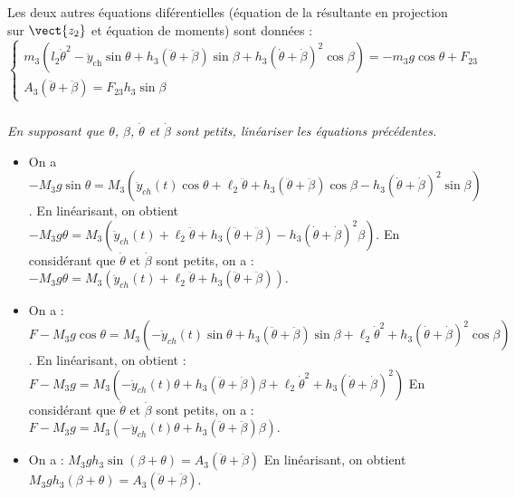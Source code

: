 \documentclass[10pt,fleqn]{article} %
\begin{document}
Les deux autres équations diférentielles (équation de la résultante en projection sur $\vect{z_2}$ et équation de moments) sont données :
$$
\left\{
\begin{array}{l}
m_3\left(
l_2\dot{\theta}^2 - \ddot{y}_{\text{ch}} \sin \theta  
+ h_3\left(\ddot{\theta}+\ddot{\beta}\right)\sin \beta
+ h_3\left(\dot{\theta}+\dot{\beta}\right)^2\cos \beta
\right)=-m_3 g \cos \theta + F_{23} \\
A_3\left(\ddot{\theta}+\ddot{\beta}\right)=F_{23}h_3\sin\beta
\end{array}
\right.
$$
\subparagraph{\label{q16}}
\textit{En supposant que $\theta$, $\beta$, $\dot{\theta}$ et $\dot{\beta}$ sont petits, linéariser les équations précédentes.  }
\ifprof
\begin{corrige}
\begin{itemize}
\item On a 
$ -M_3 g \sin \theta  = 
 M_3\left(\ddot{y}_{ch}(t) \cos \theta +\ell_2\ddot{\theta} +h_3\left(\ddot{\theta}+\ddot{\beta}\right)\cos \beta 
-h_3\left(\dot{\theta}+\dot{\beta}\right)^2\sin\beta \right)$. En linéarisant, on obtient 
$ -M_3 g \theta  = 
 M_3\left(\ddot{y}_{ch}(t) +\ell_2\ddot{\theta} +h_3\left(\ddot{\theta}+\ddot{\beta}\right) 
-h_3\left(\dot{\theta}+\dot{\beta}\right)^2\beta \right)$. En considérant que $\dot{\theta}$ et $\dot{\beta}$ sont petits, on a : 
$ -M_3 g \theta  = 
 M_3\left(\ddot{y}_{ch}(t) +\ell_2\ddot{\theta} +h_3\left(\ddot{\theta}+\ddot{\beta}\right)  \right)$.
\item  On a : $F-M_3 g \cos \theta  = 
 M_3\left(- \ddot{y}_{ch}(t) \sin \theta +h_3\left(\ddot{\theta}+\ddot{\beta}\right) \sin\beta
+   
\ell_2\dot{\theta}^2   +h_3\left(\dot{\theta}+\dot{\beta}\right)^2\cos \beta \right) $. En linéarisant, on obtient :
$F-M_3 g  = 
 M_3\left(- \ddot{y}_{ch}(t) \theta +h_3\left(\ddot{\theta}+\ddot{\beta}\right) \beta
+   
\ell_2\dot{\theta}^2   +h_3\left(\dot{\theta}+\dot{\beta}\right)^2 \right) $
En considérant que $\dot{\theta}$ et $\dot{\beta}$ sont petits, on a : 
$F-M_3 g  = 
 M_3\left(- \ddot{y}_{ch}(t) \theta +h_3\left(\ddot{\theta}+\ddot{\beta}\right) \beta
 \right) $.
 \item On a : $ M_3gh_3 \sin\left( \beta + \theta\right) =A_3 \left(\ddot{\theta}+\ddot{\beta} \right)$ En linéarisant, on obtient  $M_3gh_3 \left( \beta + \theta\right) =A_3 \left(\ddot{\theta}+\ddot{\beta} \right)$.
 \end{itemize}

\end{corrige}
\else
\fi
\end{document}
